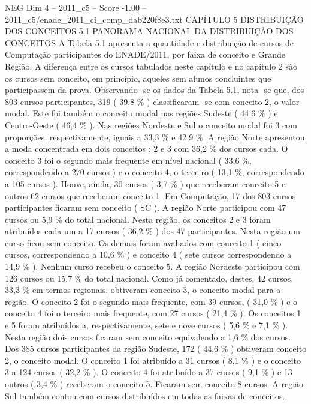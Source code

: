 \begin{textsample}{NEG Dim 4 – 2011\_c5 – Score -1.00 – 2011\_c5/enade\_2011\_ci\_comp\_dab220f8e3.txt}  \label{ex:f4_neg_113}
CAPÍTULO 5 DISTRIBUIÇÃO DOS CONCEITOS 5.1 PANORAMA NACIONAL DA DISTRIBUIÇÃO DOS CONCEITOS A Tabela 5.1 apresenta a quantidade e distribuição de cursos de Computação participantes do ENADE/2011, por faixa de conceito e Grande Região.
A diferença entre os cursos tabulados neste capítulo e no capítulo 2 são os cursos sem conceito, em princípio, aqueles sem alunos concluintes que participassem da prova.
Observando -se os dados da Tabela 5.1, nota -se que, dos 803 cursos participantes, 319 ( 39,8 \% ) classificaram -se com conceito 2, o valor modal.
Este foi também o conceito modal nas regiões Sudeste ( 44,6 \% ) e Centro-Oeste ( 46,4 \% ).
Nas regiões Nordeste e Sul o conceito modal foi 3 com proporções, respectivamente, iguais a 33,3 \% e 42,9 \%.
A região Norte apresentou a moda concentrada em dois conceitos : 2 e 3 com 36,2 \% dos cursos cada.
O conceito 3 foi o segundo mais frequente em nível nacional ( 33,6 \%, correspondendo a 270 cursos ) e o conceito 4, o terceiro ( 13,1 \%, correspondendo a 105 cursos ).
Houve, ainda, 30 cursos ( 3,7 \% ) que receberam conceito 5 e outros 62 cursos que receberam conceito 1.
Em Computação, 17 dos 803 cursos participantes ficaram sem conceito ( SC ).
A região Norte participou com 47 cursos ou 5,9 \% do total nacional.
Nesta região, os conceitos 2 e 3 foram atribuídos cada um a 17 cursos ( 36,2 \% ) dos 47 participantes.
Nesta região um curso ficou sem conceito.
Os demais foram avaliados com conceito 1 ( cinco cursos, correspondendo a 10,6 \% ) e conceito 4 ( sete cursos correspondendo a 14,9 \% ).
Nenhum curso recebeu o conceito 5.
A região Nordeste participou com 126 cursos ou 15,7 \% do total nacional.
Como já comentado, destes, 42 cursos, 33,3 \% em termos regionais, obtiveram conceito 3, o conceito modal para a região.
O conceito 2 foi o segundo mais frequente, com 39 cursos, ( 31,0 \% ) e o conceito 4 foi o terceiro mais frequente, com 27 cursos ( 21,4 \% ).
Os conceitos 1 e 5 foram atribuídos a, respectivamente, sete e nove cursos ( 5,6 \% e 7,1 \% ).
Nesta região dois cursos ficaram sem conceito equivalendo a 1,6 \% dos cursos.
Dos 385 cursos participantes da região Sudeste, 172 ( 44,6 \% ) obtiveram conceito 2, o conceito modal.
O conceito 1 foi atribuído a 31 cursos ( 8,1 \% ) e o conceito 3 a 124 cursos ( 32,2 \% ).
O conceito 4 foi atribuído a 37 cursos ( 9,1 \% ) e 13 outros ( 3,4 \% ) receberam o conceito 5.
Ficaram sem conceito 8 cursos.
A região Sul também contou com cursos distribuídos em todas as faixas de conceitos.

\end{textsample}
